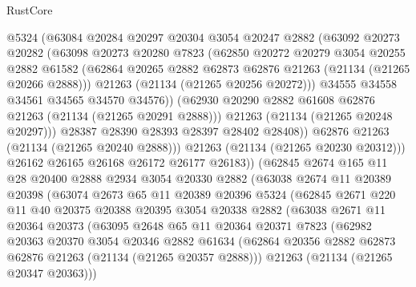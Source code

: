 \begin{lexlean}{RustCore}
\begin{coremodule}
                @5324
                (@63084
                  @20284
                  @20297
                  @20304
                  @3054
                  @20247
                  @2882
                  (@63092
                    @20273
                    @20282
                    (@63098
                      @20273
                      @20280
                      @7823
                      (@62850
                        @20272
                        @20279
                        @3054
                        @20255
                        @2882
                        @61582
                        (@62864 @20265 @2882 @62873 @62876 @21263 (@21134 (@21265 @20266 @2888)))
                        @21263
                        (@21134 (@21265 @20256 @20272)))
                      @34555
                      @34558
                      @34561
                      @34565
                      @34570
                      @34576))
                  (@62930 @20290 @2882 @61608 @62876 @21263 (@21134 (@21265 @20291 @2888)))
                  @21263
                  (@21134 (@21265 @20248 @20297)))
                @28387
                @28390
                @28393
                @28397
                @28402
                @28408))
            @62876
            @21263
            (@21134 (@21265 @20240 @2888)))
          @21263
          (@21134 (@21265 @20230 @20312)))
        @26162
        @26165
        @26168
        @26172
        @26177
        @26183))
    (@62845
      @2674
      @165
      @11
      @28
      @20400
      @2888
      @2934
      @3054
      @20330
      @2882
      (@63038
        @2674
        @11
        @20389
        @20398
        (@63074
          @2673
          @65
          @11
          @20389
          @20396
          @5324
          (@62845
            @2671
            @220
            @11
            @40
            @20375
            @20388
            @20395
            @3054
            @20338
            @2882
            (@63038
              @2671
              @11
              @20364
              @20373
              (@63095
                @2648
                @65
                @11
                @20364
                @20371
                @7823
                (@62982
                  @20363
                  @20370
                  @3054
                  @20346
                  @2882
                  @61634
                  (@62864 @20356 @2882 @62873 @62876 @21263 (@21134 (@21265 @20357 @2888)))
                  @21263
                  (@21134 (@21265 @20347 @20363)))

\end{coremodule}
\end{lexlean}
